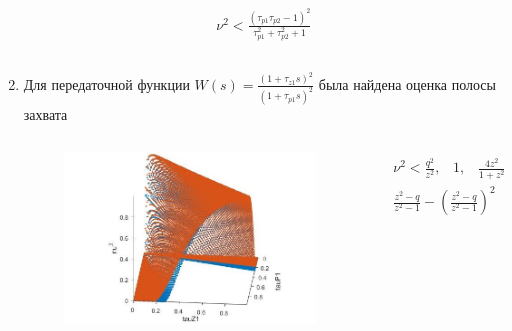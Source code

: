 \documentclass{beamer}
\begin{document}
\begin{frame}
\begin{enumerate}
\begin{columns}[onlytextwidth]
\begin{column}{.4\textwidth}
\begin{equation*}
 \begin{aligned}
\nu^2 < \frac{(\tau_{p1}\tau_{p2} - 1)^2}{\tau_{p1}^2 + \tau_{p2}^2 + 1}
 \end{aligned}
\end{equation*}
\end{column}
\end{columns}
\item Для передаточной функции $W(s) = \frac{(1+\tau_{z1}s)^2}{(1+\tau_{p1}s)^2}$
была найдена оценка полосы захвата
\begin{columns}[onlytextwidth]
\begin{column}{.3\textwidth}
\begin{figure}
    \includegraphics[width=\textwidth]{images/filter2_agregated.jpg}
\end{figure}
\end{column}
\begin{column}{.6\textwidth}
\begin{equation*}
\begin{aligned}
&\nu^2 < \frac{q^2}{z^2}\text{,} \quad 1 \text{,} \quad \frac{4z^2}{1+z^2} \text{,} \quad \frac{4(1-q)(q-z^2)}{1-z^2} \text{,} \\ 
&\frac{z^2-q}{z^2-1} - \left(\frac{z^2-q}{z^2-1}\right)^2
\end{aligned}
\end{equation*}
\end{column}
\end{columns}
\end{enumerate}
\end{frame}
\end{document}
